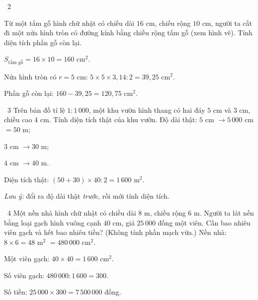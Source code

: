 \gap
\begin{exbox}{\ExWord\ 2}
\begin{minipage}[t]{0.62\linewidth}
Từ một tấm gỗ hình chữ nhật có chiều dài $16$ cm, chiều rộng $10$ cm, người ta cắt đi một nửa hình tròn có đường kính bằng chiều rộng tấm gỗ (xem hình vẽ). Tính diện tích phần gỗ còn lại.
\end{minipage}\hfill
\begin{minipage}[t]{0.34\linewidth}\vspace{0pt}\centering
{}
\end{minipage}
\guide
$S_\text{tấm gỗ}=16\times10=160$ cm$^2$.\par Nửa hình tròn có $r=5$ cm: $5\times5\times3{,}14:2=39{,}25$ cm$^2$.\par
Phần gỗ còn lại: $160-39{,}25=120{,}75$ cm$^2$.
\end{exbox}
\gap
\begin{exbox}{\ExWord\ 3}
Trên bản đồ tỉ lệ $1:1\,000$, một khu vườn hình thang có hai đáy $5$ cm và $3$ cm, chiều cao $4$ cm. Tính diện tích thật của khu vườn.
\guide
Độ dài thật: $5$ cm $\to5\,000$ cm $=50$ m;\par $3$ cm $\to30$ m;\par $4$ cm $\to40$ m.\par
Diện tích thật: $(50+30)\times40:2=1\,600$ m$^2$.\par
\emph{Lưu ý:} đổi ra độ dài thật \emph{trước}, rồi mới tính diện tích.
\end{exbox}
\gap
\begin{exbox}{\ExWord\ 4}
Một nền nhà hình chữ nhật có chiều dài $8$ m, chiều rộng $6$ m. Người ta lát nền bằng loại gạch hình vuông cạnh $40$ cm, giá $25\,000$ đồng một viên. Cần bao nhiêu viên gạch và hết bao nhiêu tiền? (Không tính phần mạch vữa.)
\guide
Nền nhà: $8\times6=48$ m$^2$ $=480\,000$ cm$^2$.\par Một viên gạch: $40\times40=1\,600$ cm$^2$.\par
Số viên gạch: $480\,000:1\,600=300$.\par Số tiền: $25\,000\times300=7\,500\,000$ đồng.
\end{exbox}
